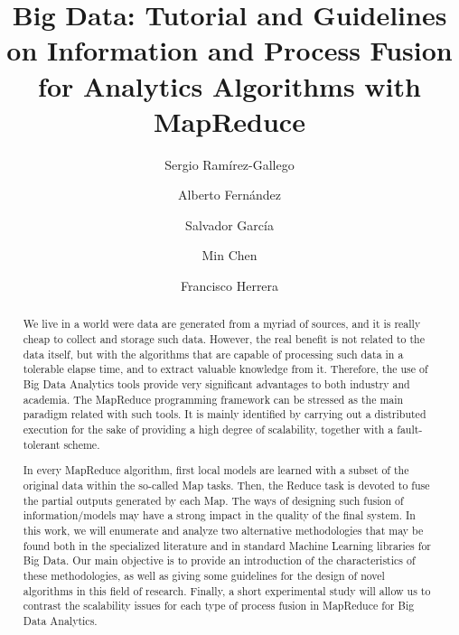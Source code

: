 \documentclass[3p,review]{elsarticle}
\begin{document}
	
	\begin{frontmatter}
		
		\title{Big Data: Tutorial and Guidelines on Information and Process Fusion for Analytics Algorithms with MapReduce}
		
		\author[grx]{Sergio Ram\'irez-Gallego}
		
		\author[grx]{Alberto Fern\'andez}
		
		\author[grx]{Salvador Garc\'ia}
		
		\author[chi]{Min Chen}
		
		\author[grx]{Francisco Herrera}
		
		\address[grx]{Department of Computer Science and Artificial Intelligence, University of Granada, Granada, Spain}
		\address[chi]{School of Computer Science and Technology, Huazhong University of Science and Technology, Wuhan, China}
		
		
		
		\begin{abstract}
			
			We live in a world were data are generated from a myriad of sources, and it is really cheap to collect and storage such data. However, the real benefit is not related to the data itself, but with the algorithms that are capable of processing such data in a tolerable elapse time, and to extract valuable knowledge from it. Therefore, the use of Big Data Analytics tools provide very significant advantages to both industry and academia. The MapReduce programming framework can be stressed as the main paradigm related with such tools. It is mainly identified by carrying out a distributed execution for the sake of providing a high degree of scalability, together with a fault-tolerant scheme. 
			
			In every MapReduce algorithm, first local models are learned with a subset of the original data within the so-called Map tasks. Then, the Reduce task is devoted to fuse the partial outputs generated by each Map. The ways of designing such fusion of information/models may have a strong impact in the quality of the final system. In this work, we will enumerate and analyze two alternative methodologies that may be found both in the specialized literature and in standard Machine Learning libraries for Big Data. Our main objective is to provide an introduction of the characteristics of these methodologies, as well as giving some guidelines for the design of novel algorithms in this field of research.  Finally, a short experimental study will allow us to contrast the scalability issues for each type of process fusion in MapReduce for Big Data Analytics.
			

\end{abstract}
\end{frontmatter}
\end{document}
